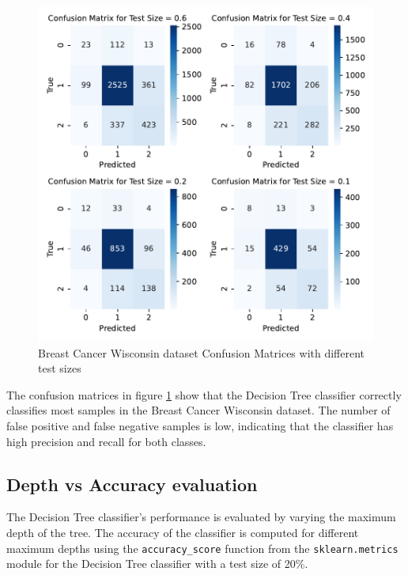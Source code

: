 \begin{figure}[H]
    \centering
    \includegraphics[width=.7\textwidth]{figures/breast_cancer_wisconsin_confusion_matrices.pdf}
    \caption{Breast Cancer Wisconsin dataset Confusion Matrices with different test sizes}
    \label{fig:breast_cancer_wisconsin_confusion_matrices}
\end{figure}

The confusion matrices in figure \ref{fig:breast_cancer_wisconsin_confusion_matrices} show that the Decision Tree classifier correctly classifies most samples in the Breast Cancer Wisconsin dataset. The number of false positive and false negative samples is low, indicating that the classifier has high precision and recall for both classes.

\subsection{Depth vs Accuracy evaluation}

The Decision Tree classifier's performance is evaluated by varying the maximum depth of the tree. The accuracy of the classifier is computed for different maximum depths using the \texttt{accuracy\_score} function from the \texttt{sklearn.metrics} module for the Decision Tree classifier with a test size of 20\%.

